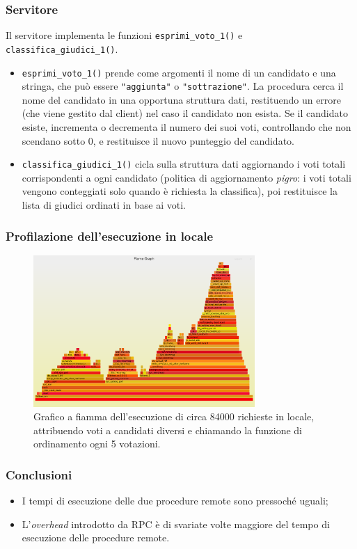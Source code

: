 \documentclass{beamer}
\begin{document}
\begin{frame}
    \frametitle{Servitore}
Il servitore implementa le funzioni \texttt{esprimi\_voto\_1()} e \texttt{classifica\_giudici\_1()}.
\begin{itemize}
    \item \texttt{esprimi\_voto\_1()} prende come argomenti il nome di un candidato e una stringa, che può essere \texttt{"aggiunta"} o \texttt{"sottrazione"}. La procedura cerca il nome del candidato in una opportuna struttura dati, restituendo un errore (che viene gestito dal client) nel caso il candidato non esista. Se il candidato esiste, incrementa o decrementa il numero dei suoi voti, controllando che non scendano sotto 0, e restituisce il nuovo punteggio del candidato.
    \item \texttt{classifica\_giudici\_1()} cicla sulla struttura dati aggiornando i voti totali corrispondenti a ogni candidato (politica di aggiornamento \textit{pigro}: i voti totali vengono conteggiati solo quando è richiesta la classifica), poi restituisce la lista di giudici ordinati in base ai voti.
\end{itemize}

\end{frame}
\begin{frame}
    \frametitle{Profilazione dell'esecuzione in locale}
    \begin{figure}[ht]
        \centering
        
        \includegraphics[width = 0.75\textwidth]{fattore.png}
        
        \caption{Grafico a fiamma dell'esecuzione di circa 84000 richieste in locale, attribuendo voti a candidati diversi e chiamando la funzione di ordinamento ogni 5 votazioni.}
        \label{fig:local}
    \end{figure}    

\end{frame}
\begin{frame}
    \frametitle{Conclusioni}
    \begin{itemize}
        \item I tempi di esecuzione delle due procedure remote sono pressoché uguali;
        \item L'\textit{overhead} introdotto da RPC è di svariate volte maggiore del tempo di esecuzione delle procedure remote.
    \end{itemize}
\end{frame}
\end{document}
